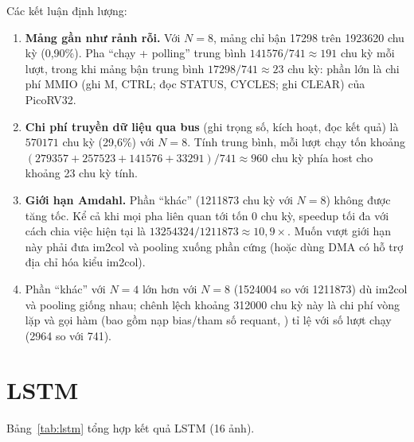 Các kết luận định lượng:
\begin{enumerate}
  \item \textbf{Mảng gần như rảnh rỗi.} Với $N=8$, mảng chỉ bận \num{17298} trên \num{1923620} chu kỳ (0,90\%). Pha ``chạy + polling'' trung bình $\num{141576}/741\approx191$ chu kỳ mỗi lượt, trong khi mảng bận trung bình $\num{17298}/741\approx23$ chu kỳ: phần lớn là chi phí MMIO (ghi M, CTRL; đọc STATUS, CYCLES; ghi CLEAR) của PicoRV32.
  \item \textbf{Chi phí truyền dữ liệu qua bus} (ghi trọng số, kích hoạt, đọc kết quả) là $\num{570171}$ chu kỳ (29,6\%) với $N=8$. Tính trung bình, mỗi lượt chạy tốn khoảng $(\num{279357}+\num{257523}+\num{141576}+\num{33291})/741\approx960$ chu kỳ phía host cho khoảng 23 chu kỳ tính.
  \item \textbf{Giới hạn Amdahl.} Phần ``khác'' (\num{1211873} chu kỳ với $N=8$) không được tăng tốc. Kể cả khi mọi pha liên quan tới \NPU{} tốn 0 chu kỳ, speedup tối đa với cách chia việc hiện tại là $\num{13254324}/\num{1211873}\approx10{,}9\times$. Muốn vượt giới hạn này phải đưa im2col và pooling xuống phần cứng (hoặc dùng DMA có hỗ trợ địa chỉ hóa kiểu im2col).
  \item Phần ``khác'' với $N=4$ lớn hơn với $N=8$ (\num{1524004} so với \num{1211873}) dù im2col và pooling giống nhau; chênh lệch khoảng \num{312000} chu kỳ này là chi phí vòng lặp và gọi hàm (bao gồm nạp bias/tham số requant, ) tỉ lệ với số lượt chạy (\num{2964} so với 741).
\end{enumerate}

\section{LSTM}
\label{sec:res-lstm}
Bảng~\ref{tab:lstm} tổng hợp kết quả LSTM (16 ảnh).

